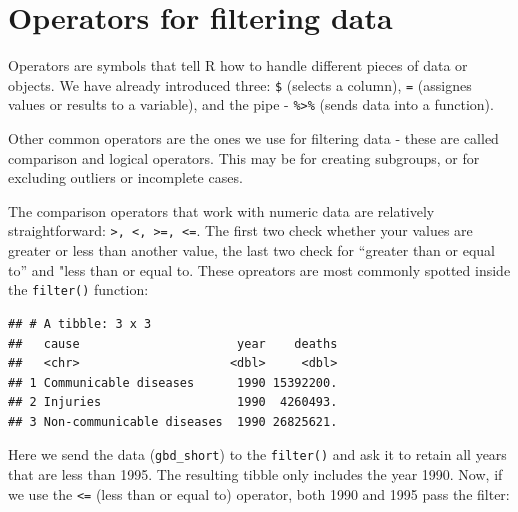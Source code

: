 \documentclass[12pt,]{krantz}
\makeatletter
\newenvironment{Shaded}{\begin{snugshade}}{\end{snugshade}}
\newcommand{\DecValTok}[1]{\textcolor[rgb]{0.00,0.00,0.81}{#1}}
\newcommand{\KeywordTok}[1]{\textcolor[rgb]{0.13,0.29,0.53}{\textbf{#1}}}
\newcommand{\NormalTok}[1]{#1}
\newcommand{\OperatorTok}[1]{\textcolor[rgb]{0.81,0.36,0.00}{\textbf{#1}}}
\newcommand{\StringTok}[1]{\textcolor[rgb]{0.31,0.60,0.02}{#1}}
\newenvironment{kframe}{%
\medskip{}
\setlength{\fboxsep}{.8em}
 \def\at@end@of@kframe{}%
 \ifinner\ifhmode%
  \def\at@end@of@kframe{\end{minipage}}%
  \begin{minipage}{\columnwidth}%
 \fi\fi%
 \def\FrameCommand##1{\hskip\@totalleftmargin \hskip-\fboxsep
 \colorbox{shadecolor}{##1}\hskip-\fboxsep
     \hskip-\linewidth \hskip-\@totalleftmargin \hskip\columnwidth}%
 \MakeFramed {\advance\hsize-\width
   \@totalleftmargin\z@ \linewidth\hsize
   \@setminipage}}%
 {\par\unskip\endMakeFramed%
 \at@end@of@kframe}
\renewenvironment{Shaded}{\begin{kframe}}{\end{kframe}}
\theoremstyle{definition}
\theoremstyle{definition}
\theoremstyle{definition}
\theoremstyle{remark}
\makeatother
\begin{document}
\clearpage

\hypertarget{operators-for-filtering-data}{%
\section{Operators for filtering
data}\label{operators-for-filtering-data}}

Operators are symbols that tell R how to handle different pieces of data
or objects. We have already introduced three: \texttt{\$} (selects a
column), \texttt{=} (assignes values or results to a variable), and the
pipe - \texttt{\%\textgreater{}\%} (sends data into a function).

Other common operators are the ones we use for filtering data - these
are called comparison and logical operators. This may be for creating
subgroups, or for excluding outliers or incomplete cases.

The comparison operators that work with numeric data are relatively
straightforward:
\texttt{\textgreater{},\ \textless{},\ \textgreater{}=,\ \textless{}=}.
The first two check whether your values are greater or less than another
value, the last two check for ``greater than or equal to'' and "less
than or equal to. These opreators are most commonly spotted inside the
\texttt{filter()} function:

\begin{Shaded}
\end{Shaded}

\begin{verbatim}
## # A tibble: 3 x 3
##   cause                      year    deaths
##   <chr>                     <dbl>     <dbl>
## 1 Communicable diseases      1990 15392200.
## 2 Injuries                   1990  4260493.
## 3 Non-communicable diseases  1990 26825621.
\end{verbatim}

Here we send the data (\texttt{gbd\_short}) to the \texttt{filter()} and
ask it to retain all years that are less than 1995. The resulting tibble
only includes the year 1990. Now, if we use the \texttt{\textless{}=}
(less than or equal to) operator, both 1990 and 1995 pass the filter:

\begin{Shaded}
\end{Shaded}
\end{document}
